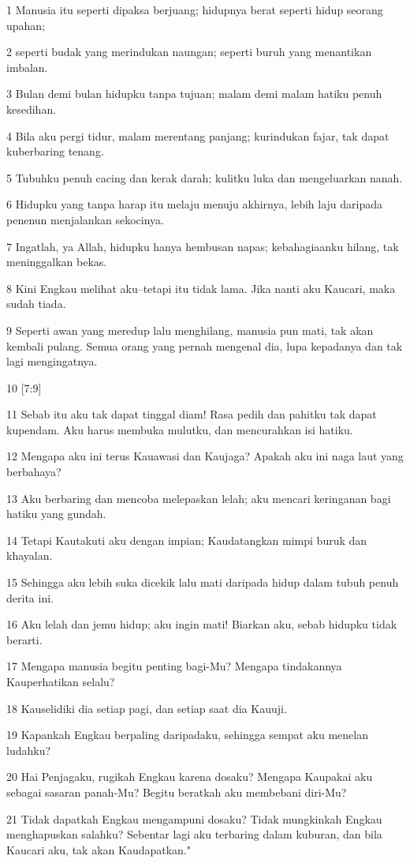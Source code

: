 \par 1 Manusia itu seperti dipaksa berjuang; hidupnya berat seperti hidup seorang upahan;
\par 2 seperti budak yang merindukan naungan; seperti buruh yang menantikan imbalan.
\par 3 Bulan demi bulan hidupku tanpa tujuan; malam demi malam hatiku penuh kesedihan.
\par 4 Bila aku pergi tidur, malam merentang panjang; kurindukan fajar, tak dapat kuberbaring tenang.
\par 5 Tubuhku penuh cacing dan kerak darah; kulitku luka dan mengeluarkan nanah.
\par 6 Hidupku yang tanpa harap itu melaju menuju akhirnya, lebih laju daripada penenun menjalankan sekocinya.
\par 7 Ingatlah, ya Allah, hidupku hanya hembusan napas; kebahagiaanku hilang, tak meninggalkan bekas.
\par 8 Kini Engkau melihat aku--tetapi itu tidak lama. Jika nanti aku Kaucari, maka sudah tiada.
\par 9 Seperti awan yang meredup lalu menghilang, manusia pun mati, tak akan kembali pulang. Semua orang yang pernah mengenal dia, lupa kepadanya dan tak lagi mengingatnya.
\par 10 [7:9]
\par 11 Sebab itu aku tak dapat tinggal diam! Rasa pedih dan pahitku tak dapat kupendam. Aku harus membuka mulutku, dan mencurahkan isi hatiku.
\par 12 Mengapa aku ini terus Kauawasi dan Kaujaga? Apakah aku ini naga laut yang berbahaya?
\par 13 Aku berbaring dan mencoba melepaskan lelah; aku mencari keringanan bagi hatiku yang gundah.
\par 14 Tetapi Kautakuti aku dengan impian; Kaudatangkan mimpi buruk dan khayalan.
\par 15 Sehingga aku lebih suka dicekik lalu mati daripada hidup dalam tubuh penuh derita ini.
\par 16 Aku lelah dan jemu hidup; aku ingin mati! Biarkan aku, sebab hidupku tidak berarti.
\par 17 Mengapa manusia begitu penting bagi-Mu? Mengapa tindakannya Kauperhatikan selalu?
\par 18 Kauselidiki dia setiap pagi, dan setiap saat dia Kauuji.
\par 19 Kapankah Engkau berpaling daripadaku, sehingga sempat aku menelan ludahku?
\par 20 Hai Penjagaku, rugikah Engkau karena dosaku? Mengapa Kaupakai aku sebagai sasaran panah-Mu? Begitu beratkah aku membebani diri-Mu?
\par 21 Tidak dapatkah Engkau mengampuni dosaku? Tidak mungkinkah Engkau menghapuskan salahku? Sebentar lagi aku terbaring dalam kuburan, dan bila Kaucari aku, tak akan Kaudapatkan."

